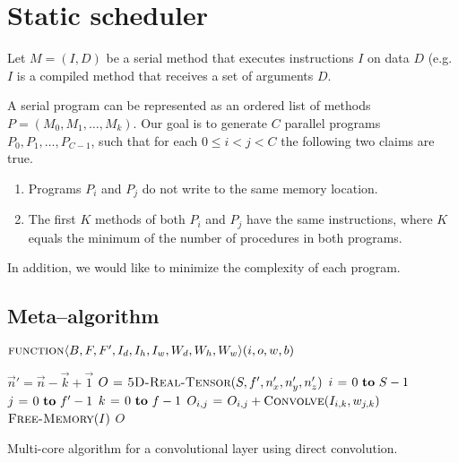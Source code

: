 \section{Static scheduler}

  Let $M = (I, D)$ be a serial method that executes instructions $I$
  on data $D$ (e.g. $I$ is a compiled method that receives a set of
  arguments $D$.

  A serial program can be represented as an ordered list of methods $P
  = (M_0, M_1, \dots, M_k)$.  Our goal is to generate $C$ parallel
  programs $P_0, P_1, \dots, P_{C-1}$, such that for each $0 \le i < j
  < C$ the following two claims are true.

  \begin{enumerate}
    \item Programs $P_i$ and $P_j$ do not write to the same memory
      location.
    \item The first $K$ methods of both $P_i$ and $P_j$ have the same
      instructions, where $K$ equals the minimum of the number of
      procedures in both programs.
  \end{enumerate}

  In addition, we would like to minimize the complexity of each
  program.

  \subsection{Meta--algorithm}

  $\textnormal{\scshape function} \langle B, F, F', I_d, I_h, I_w, W_d, W_h, W_w \rangle ( i, o, w, b )$


  \begin{algorithm}
    {\footnotesize
      \begin{codebox}
        \li $\vec{n}' = \vec{n} - \vec{k} + \vec{1}$
        \li $O \mathrel{\hspace{1pt}=\hspace{1pt}} \textnormal{\scshape5D-Real-Tensor}(S,f',n'_x,n'_y,n'_z)$
        \li {} $i \gets 0 \To S-1$
        \li   \Do {} $j \gets 0 \To f'-1$
        \li     \Do \For $k \gets 0 \To f-1$
        \li     \Do $O_{i,j} \mathrel{\hspace{1pt}=\hspace{1pt}} O_{i,j} + \textnormal{\scshape Convolve}(I_{i,k},w_{j,k})$
        \End \End \End
        \li $\textnormal{\scshape Free-Memory}(I)$
        \li \Return $O$
      \end{codebox}
    \caption{Multi-core algorithm for a convolutional layer using direct
      convolution.}
    \label{alg:cpu_direct}
    }
  \end{algorithm}
